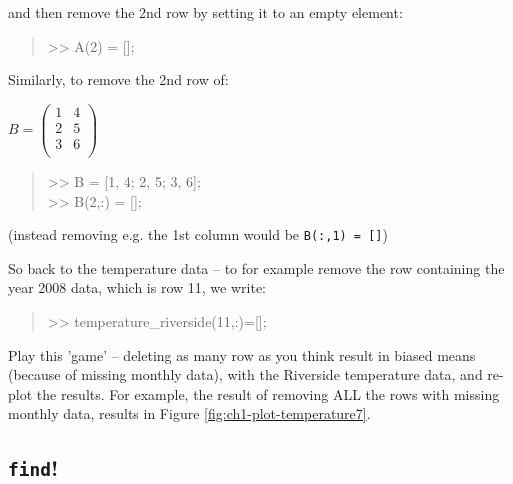 \documentclass{tufte-book} %
\newenvironment{docspec}{\begin{quotation}\ttfamily\parskip0pt\parindent0pt\ignorespaces}{\end{quotation}}
\begin{document}
\noindent and then remove the 2nd row by setting it to an empty element:

\begin{docspec}
>> A(2) = [];
\end{docspec}

Similarly, to remove the 2nd row of:

\vspace{2mm}
\(B=\begin{pmatrix}1 & 4 \\
2 & 5 \\
3 & 6 \\
\end{pmatrix}\)
\vspace{2mm}

\begin{docspec}
>> B = [1, 4; 2, 5; 3, 6];\\
>> B(2,:) = [];
\end{docspec}

\noindent (instead removing e.g. the 1st column would be \texttt{B(:,1) = []})

So back to the temperature data -- to for example remove the row containing the year 2008 data, which is row 11, we write:

\begin{docspec}
>> temperature\_riverside(11,:)=[];
\end{docspec}

Play this 'game' -- deleting as many row as you think result in biased means (because of missing monthly data), with the Riverside temperature data, and re-plot the results.
For example, the result of removing ALL the rows with missing monthly data, results in Figure \ref{fig:ch1-plot-temperature7}.

%
\newpage


\subsection{\texttt{find}!}
\end{document}
